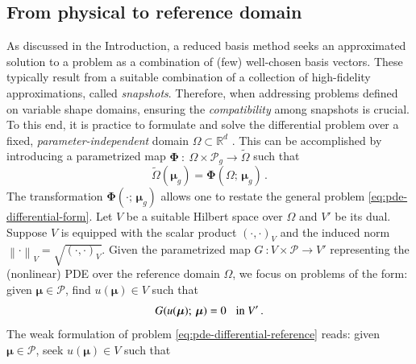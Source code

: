 \documentclass[longtitle]{elsarticle}
\numberwithin{equation}{section}
\theoremstyle{theorem}
\theoremstyle{definition}
\theoremstyle{remark}
\theoremstyle{proposition}
\numberwithin{figure}{section}
\newcommand{\norm}[1]{\left\lVert#1\right\rVert}
\newcommand{\wt}[1]{\widetilde{#1}}
\newcommand{\bg}[1]{\boldsymbol{#1}}
\begin{document}
		
	\subsection{From physical to reference domain}
	\label{section:From physical to reference domain}

		As discussed in the Introduction, a reduced basis method seeks an approximated solution to a problem as a combination of (few) well-chosen basis vectors. These typically result from a suitable combination of a collection of high-fidelity approximations, called \emph{snapshots}. Therefore, when addressing problems defined on variable shape domains, ensuring the \emph{compatibility} among snapshots is crucial. To this end, it is practice to formulate and solve the differential problem over a fixed, \emph{parameter-independent} domain $\Omega \subset \mathbb{R}^d$ \cite{MN16}. This can be accomplished by introducing a parametrized map $\bg{\Phi} ~ : ~ \Omega \times \mathcal{P}_g \rightarrow \wt{\Omega}$ such that
		\begin{equation*}
			\wt{\Omega}(\bg{\mu}_g) = \bg{\Phi}(\Omega; \, \bg{\mu}_g) \, .
		\end{equation*}
		The transformation $\bg{\Phi}(\cdot; \, \bg{\mu}_g)$ allows one to restate the general problem \eqref{eq:pde-differential-form}. Let $V$ be a suitable Hilbert space over $\Omega$ and $V'$ be its dual. Suppose $V$ is equipped with the scalar product $(\cdot, \cdot)_V$ and the induced norm $\norm{\cdot}_V = \sqrt{(\cdot, \cdot)_V}$. Given the parametrized map $G ~ : V \times \mathcal{P} \rightarrow V'$ representing the (nonlinear) PDE over the reference domain $\Omega$, we focus on problems of the form: given $\bg{\mu} \in \mathcal{P}$, find $u(\bg{\mu}) \in V$ such that
		\begin{equation}
			\label{eq:pde-differential-reference}
			G(u(\bg{\mu}); \, \bg{\mu}) = 0 \hspace*{0.3cm} \text{in $V'$} \, .
		\end{equation}
		The weak formulation of problem \eqref{eq:pde-differential-reference} reads: given $\bg{\mu} \in \mathcal{P}$, seek $u(\bg{\mu}) \in V$ such that
\end{document}
